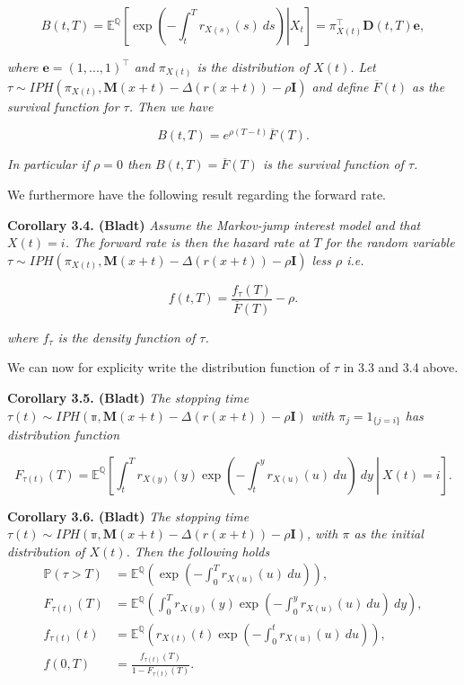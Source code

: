 \documentclass[
]{book}
\begin{document}
\[
B(t,T)=\mathbb E^{\mathbb Q}\left[\left.\exp\left(-\int_t^Tr_{X(s)}(s)\ ds\right) \right\vert X_t\right]=\pi_{X(t)}^\top\mathbf D(t,T)\mathbf e,
\]

\emph{where \(\mathbf e=(1,...,1)^\top\) and \(\pi_{X(t)}\) is the distribution of \(X(t)\). Let \(\tau\sim IPH(\pi_{X(t)},\mathbf M(x+t)-\Delta (r(x+t))-\rho \mathbf I)\) and define \(\overline F(t)\) as the survival function for \(\tau\). Then we have}

\[
B(t,T)=e^{\rho (T-t)}\overline F(T).
\]

\emph{In particular if \(\rho = 0\) then \(B(t,T)=\overline F(T)\) is the survival function of \(\tau\).}

We furthermore have the following result regarding the forward rate.

\textbf{Corollary 3.4. (Bladt)} \emph{Assume the Markov-jump interest model and that \(X(t)=i\). The forward rate is then the hazard rate at \(T\) for the random variable \(\tau\sim IPH(\pi_{X(t)},\mathbf M(x+t)-\Delta (r(x+t))-\rho \mathbf I)\) less \(\rho\) i.e.}

\[
f(t,T)=\frac{f_{\tau}(T)}{\overline F(T)}-\rho.
\]

\emph{where \(f_\tau\) is the density function of \(\tau\).}

We can now for explicity write the distribution function of \(\tau\) in 3.3 and 3.4 above.

\textbf{Corollary 3.5. (Bladt)} \emph{The stopping time \(\tau(t)\sim IPH(\mathbb \pi,\mathbf M(x+t)-\Delta (r(x+t))-\rho \mathbf I)\) with \(\pi_j=1_{\{j=i\}}\) has distribution function}

\[
F_{\tau(t)}(T)=\mathbb E^{\mathbb Q}\left[\left.\int_t^T r_{X(y)}(y)\exp\left(-\int_t^yr_{X(u)}(u)\ du\right)\ dy\ \right\vert\ X(t)=i\right].
\]

\textbf{Corollary 3.6. (Bladt)} \emph{The stopping time \(\tau(t)\sim IPH(\mathbb \pi,\mathbf M(x+t)-\Delta (r(x+t))-\rho \mathbf I)\), with \(\pi\) as the initial distribution of \(X(t)\). Then the following holds}
\begin{align*}
\mathbb P(\tau > T)&=\mathbb E^{\mathbb Q}\left(\exp\left(-\int_0^T r_{X(u)}(u)\ du\right)\right),\\
F_{\tau(t)}(T)&=\mathbb E^{\mathbb Q}\left(\int_0^T r_{X(y)}(y)\exp\left(-\int_0^y r_{X(u)}(u)\ du\right)\ dy\right),\\
f_{\tau(t)}(t)&=\mathbb E^{\mathbb Q}\left( r_{X(t)}(t)\exp\left(-\int_0^t r_{X(u)}(u)\ du\right)\right),\\
f(0,T)&=\frac{f_{\tau(t)}(T)}{1-F_{\tau(t)}(T)}.
\end{align*}
\end{document}
